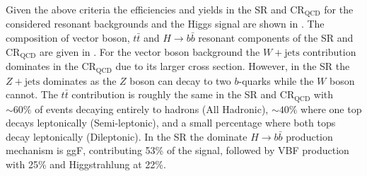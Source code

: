 Given the above criteria the efficiencies and yields in the SR and
$\text{CR}_{\text{QCD}}$ for the considered resonant backgrounds and the Higgs
signal are shown in . The composition of vector boson, $t\bar{t}$ and $H
\rightarrow b\bar{b}$ resonant components of the SR and
$\text{CR}_{\text{QCD}}$ are given in . For the vector boson background
the $W+\text{jets}$ contribution dominates in the $\text{CR}_{\text{QCD}}$ due to its
larger cross section.  However, in the SR the $Z+\text{jets}$ dominates as the $Z$
boson can decay to two $b$-quarks while the $W$ boson cannot.  The $t\bar{t}$
contribution is roughly the same in the SR and $\text{CR}_{\text{QCD}}$ with
$\sim 60\%$ of events decaying entirely to hadrons (All Hadronic), $\sim 40\%$
where one top decays leptonically (Semi-leptonic), and a small percentage where
both tops decay leptonically (Dileptonic). In the SR the dominate $H
\rightarrow b\bar{b}$ production mechanism is ggF, contributing 53\% of the
signal, followed by VBF production with 25\% and Higgstrahlung at 22\%. 

